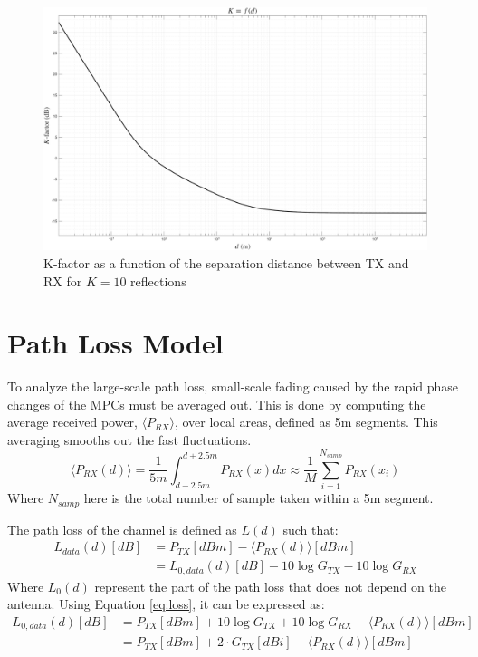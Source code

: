\begin{figure}
	\centering
	\includegraphics[width=\linewidth]{content/4-images/k-factor}
	\caption{K-factor as a function of the separation distance between TX and RX for $K=10$ reflections}
	\label{fig:k-factor}
\end{figure}

\section{Path Loss Model}
To analyze the large-scale path loss, small-scale fading caused by the rapid phase changes of the MPCs must be averaged out. This is done by computing the average received power, $\langle P_{RX} \rangle$, over local areas, defined as 5m segments. This averaging smooths out the fast fluctuations.
\begin{equation}
	\langle P_{RX}(d) \rangle = \frac{1}{5m} \int_{d-2.5m}^{d+2.5m} P_{RX}(x) dx \approx \frac{1}{M} \sum_{i=1}^{N_{samp}} P_{RX}(x_i)
\end{equation}
Where $N_{samp}$ here is the total number of sample taken within a 5m segment.

The path loss of the channel is defined as $L(d)$ such that:
\begin{align}
	\label{eq:loss}
	L_{data}(d) [dB] &= P_{TX} [dBm] - \langle P_{RX}(d) \rangle [dBm]\\
			  &= L_{0, data}(d) [dB] - 10 \log G_{TX} - 10 \log G_{RX} \label{eq:loss-3}
\end{align}
Where $L_0(d)$ represent the part of the path loss that does not depend on the antenna. Using Equation \eqref{eq:loss}, it can be expressed as:
\begin{align}
	L_{0, data}(d) [dB] &=  P_{TX} [dBm] + 10 \log G_{TX} + 10 \log G_{RX} - \langle P_{RX}(d) \rangle [dBm]
	\label{eq:loss-2}\\
				&= P_{TX} [dBm] + 2 \cdot G_{TX} [dBi] - \langle P_{RX}(d) \rangle [dBm]
\end{align}

